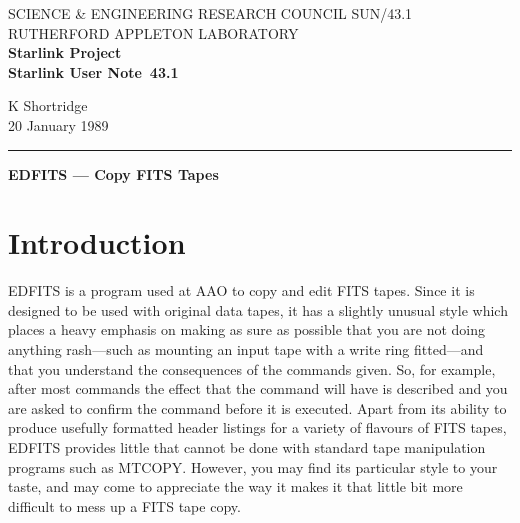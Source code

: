 \pagestyle{myheadings}

\newcommand{\stardoccategory}  {Starlink User Note}
\newcommand{\stardocinitials}  {SUN}
\newcommand{\stardocnumber}    {43.1}
\newcommand{\stardocauthors}   {K Shortridge}
\newcommand{\stardocdate}      {20 January 1989}
\newcommand{\stardoctitle}     {EDFITS --- Copy FITS Tapes}

\newcommand{\stardocname}{\stardocinitials /\stardocnumber}
\renewcommand{\_}{{\tt\char'137}}
\markright{\stardocname}
\setlength{\textwidth}{160mm}
\setlength{\textheight}{240mm}
\setlength{\topmargin}{-5mm}
\setlength{\oddsidemargin}{0mm}
\setlength{\evensidemargin}{0mm}
\setlength{\parindent}{0mm}
\setlength{\parskip}{\medskipamount}
\setlength{\unitlength}{1mm}


\thispagestyle{empty}
SCIENCE \& ENGINEERING RESEARCH COUNCIL \hfill \stardocname\\
RUTHERFORD APPLETON LABORATORY\\
{\large\bf Starlink Project\\}
{\large\bf \stardoccategory\ \stardocnumber}
\begin{flushright}
\stardocauthors\\
\stardocdate
\end{flushright}
\vspace{-4mm}
\rule{\textwidth}{0.5mm}
\vspace{5mm}
\begin{center}
{\Large\bf \stardoctitle}
\end{center}
\vspace{5mm}

\section{Introduction}

EDFITS is a program used at AAO to copy and edit FITS tapes.  Since it is
designed to be used with original data tapes, it has a slightly unusual
style which places a heavy emphasis on making as sure as possible that you
are not doing anything rash---such as mounting an input tape with a write
ring fitted---and that you understand the consequences of the commands
given.  So, for example, after most commands the effect that the command will
have is described and you are asked to confirm the command before it is
executed.  Apart from its ability to produce usefully formatted header listings
for a variety of flavours of FITS tapes, EDFITS provides little that cannot
be done with standard tape manipulation programs such as MTCOPY.  However,
you may find its particular style to your taste, and may come to appreciate
the way it makes it that little bit more difficult to mess up a FITS tape
copy.

